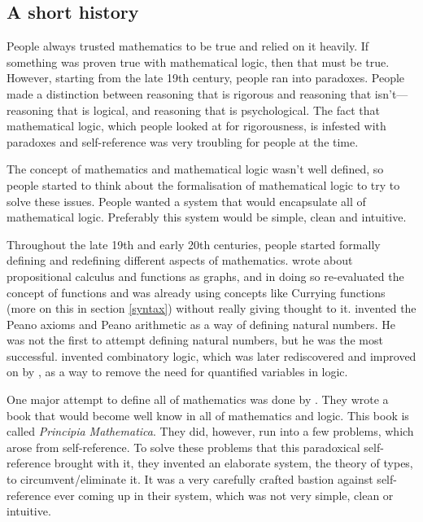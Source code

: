 \documentclass[11pt]{article}
\begin{document}
\subsection{A short history\label{history}}

People always trusted mathematics to be true and relied on it heavily. If
something was proven true with mathematical logic, then that must be true.
However, starting from the late 19th century, people ran into paradoxes. People
made a distinction between reasoning that is rigorous and reasoning that
isn't---reasoning that is logical, and reasoning that is psychological. The
fact that mathematical logic, which people looked at for rigorousness, is
infested with paradoxes and self-reference was very troubling for people at the
time.

The concept of mathematics and mathematical logic wasn't well defined, so
people started to think about the formalisation of mathematical logic to try to
solve these issues. People wanted a system that would encapsulate all of
mathematical logic. Preferably this system would be simple, clean and
intuitive.

Throughout the late 19th and early 20th centuries, people started formally
defining and redefining different aspects of mathematics. \textcite{frege1879}
wrote about propositional calculus and functions as graphs, and in doing so
re-evaluated the concept of functions and was already using concepts like
Currying functions (more on this in section \ref{syntax}) without really giving
thought to it. \textcite{peano1889} invented the Peano axioms and Peano
arithmetic as a way of defining natural numbers. He was not the first to
attempt defining natural numbers, but he was the most successful.
\textcite{schonfinkel1924} invented combinatory logic, which was later
rediscovered and improved on by \textcite{curry1930}, as a way to remove the
need for quantified variables in logic.

One major attempt to define all of mathematics was done by
\textcite{russell1997}. They wrote a book that would become well know in all of
mathematics and logic. This book is called \emph{Principia Mathematica}. They
did, however, run into a few problems, which arose from self-reference. To
solve these problems that this paradoxical self-reference brought with it, they
invented an elaborate system, the theory of types, to circumvent/eliminate it.
It was a very carefully crafted bastion against self-reference ever coming up
in their system, which was not very simple, clean or intuitive.
\end{document}
